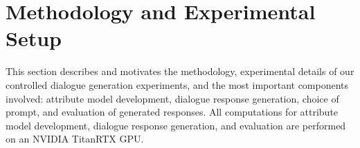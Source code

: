 \section{Methodology and Experimental Setup}
\label{sec:exp2_methods}


This section describes and motivates the methodology, experimental details of our controlled dialogue generation experiments, and the most important components involved: attribute model development, dialogue response generation, choice of prompt, and evaluation of generated responses. All computations for attribute model development, dialogue response generation, and evaluation are performed on an NVIDIA TitanRTX GPU.





